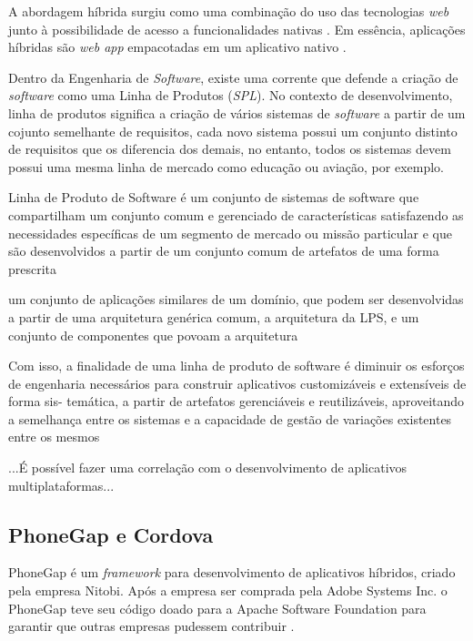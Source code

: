 A abordagem híbrida surgiu como uma combinação do uso das tecnologias \textit{web} junto à possibilidade de acesso a funcionalidades nativas \cite{heitkotter_evaluating_2013}.
Em essência, aplicações híbridas são \textit{web app} empacotadas em um aplicativo nativo \cite{stark_building_2010}.


Dentro da Engenharia de \textit{Software}, existe uma corrente que defende a criação de \textit{software} como uma Linha de Produtos (\textit{SPL}). 
No contexto de desenvolvimento, linha de produtos significa a criação de vários sistemas de \textit{software} a partir de um cojunto semelhante de requisitos,
cada novo sistema possui um conjunto distinto de requisitos que os diferencia dos demais, no entanto, todos os sistemas devem possui uma mesma linha de mercado
como educação ou aviação, por exemplo.

Linha de Produto de Software é um conjunto de sistemas de software que compartilham
um conjunto comum e gerenciado de características satisfazendo as necessidades específicas
de um segmento de mercado ou missão particular e que são desenvolvidos a partir de um
conjunto comum de artefatos de uma forma prescrita

um conjunto de aplicações
similares de um domínio, que podem ser desenvolvidas a partir de uma arquitetura genérica
comum, a arquitetura da LPS, e um conjunto de componentes que povoam a arquitetura

Com isso, a finalidade de uma linha de produto de software é diminuir os esforços de
engenharia necessários para construir aplicativos customizáveis e extensíveis de forma sis-
temática, a partir de artefatos gerenciáveis e reutilizáveis, aproveitando a semelhança entre
os sistemas e a capacidade de gestão de variações existentes entre os mesmos



...É possível fazer uma correlação com o desenvolvimento de aplicativos multiplataformas...

\subsection{PhoneGap e Cordova} \label{subsection:phonegap}

PhoneGap é um \textit{framework} para desenvolvimento de aplicativos híbridos, criado pela empresa Nitobi. 
Após a empresa ser comprada pela Adobe Systems Inc. o PhoneGap teve seu código doado para a Apache Software Foundation 
para garantir que outras empresas pudessem contribuir \cite{bezerra_desenvolvimento_2016}.%



